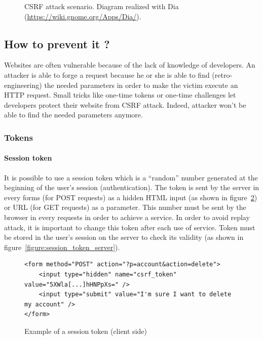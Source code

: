 \documentclass[a4paper,11pt,openany]{report}
\begin{document}
\begin{figure}[h!t]
  \begin{center}
    \caption{
      CSRF attack scenario. Diagram realized with Dia (\url{https://wiki.gnome.org/Apps/Dia/}).
    }
    \label{figure:csrf_scenario}
  \end{center}
\end{figure}
  
  \subsection{How to prevent it ?}
  Websites are often vulnerable because of the lack of knowledge of developers. An attacker is able 
  to forge a request because he or she is able to find (retro-engineering) the needed parameters in 
  order to make the victim execute an HTTP request. Small tricks like one-time tokens or one-time challenges let 
  developers protect their website from CSRF attack. Indeed, attacker won't be able to find the needed 
  parameters anymore.
  
  \subsubsection{Tokens}
  
  \paragraph{Session token}
  It is possible to use a session token which is a ``random'' number generated at the beginning 
  of the user's session (authentication). The token is sent by the server in every forms (for POST 
  requests) as a hidden HTML input (as shown in figure~\ref{figure:session_token_client}) or URL 
  (for GET requests) as a parameter. This number must be sent by the browser in every requests in 
  order to achieve a service. In order to avoid replay attack, it is important to change this token 
  after each use of service. Token must be stored in the user's session on the server to check its 
  validity (as shown in figure~\ref{figure:session_token_server}).
  
  \begin{figure}[h!t]
  \begin{verbatim}
<form method="POST" action="?p=account&action=delete">
    <input type="hidden" name="csrf_token" value="5XWla[...]hHNPpXs=" />
    <input type="submit" value="I'm sure I want to delete my account" />
</form>
  \end{verbatim}
  \caption{Example of a session token (client side)}
  \label{figure:session_token_client}
  \end{figure}
  
\end{document}
